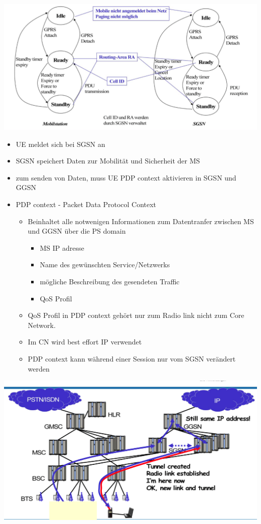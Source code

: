\begin{minipage}{0.5 \linewidth}
\includegraphics[width = \linewidth]{./Pics/GPRSZustandsdarstellung} \\
\end{minipage}
\begin{minipage}{0.5 \linewidth}
\begin{itemize}
\item UE meldet sich bei SGSN an
\item SGSN speichert Daten zur Mobilität und Sicherheit der MS
\item zum senden von Daten, muss UE PDP context aktivieren in SGSN  und GGSN
\item PDP context - Packet Data Protocol Context
\begin{itemize}
\item Beinhaltet alle notwenigen Informationen zum Datentranfer zwischen MS und GGSN über die PS domain
\begin{itemize}
\item MS IP adresse
\item Name des gewünschten Service/Netzwerks
\item mögliche Beschreibung des gesendeten Traffic
\item QoS Profil 
\end{itemize}
\item QoS Profil in PDP context gehört nur zum Radio link nicht zum Core Network. 
\item Im CN wird best effort IP verwendet
\item PDP context kann während einer Session nur vom SGSN verändert werden
\end{itemize}
\end{itemize}

\includegraphics[width = \linewidth]{./Pics/changingSGSN} \\


\end{minipage}
